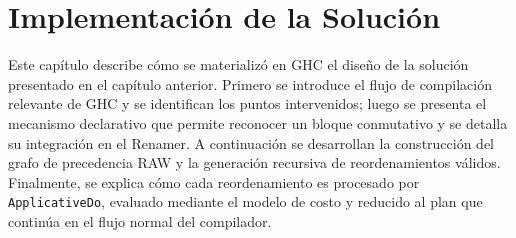 
\chapter{Implementación de la Solución}
\label{chap:implementacion-solucion}

Este capítulo describe cómo se materializó en \textsf{GHC} el diseño de la solución presentado en el capítulo anterior. Primero se introduce el flujo de compilación relevante de \textsf{GHC} y se identifican los puntos intervenidos; luego se presenta el mecanismo declarativo que permite reconocer un bloque conmutativo y se detalla su integración en el Renamer. A continuación se desarrollan la construcción del grafo de precedencia RAW y la generación recursiva de reordenamientos válidos. Finalmente, se explica cómo cada reordenamiento es procesado por \texttt{ApplicativeDo}, evaluado mediante el modelo de costo y reducido al plan que continúa en el flujo normal del compilador.







